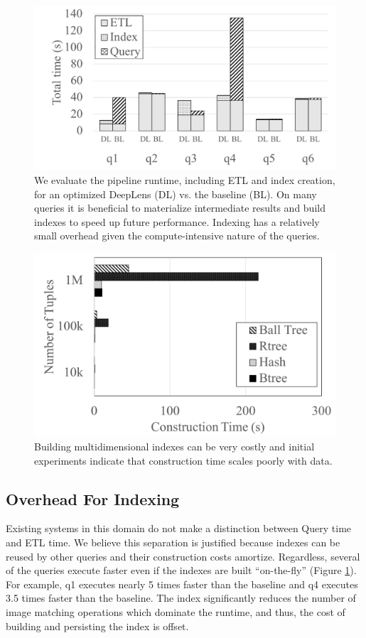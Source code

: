 \begin{figure}[t]
\centering
 \includegraphics[width=\columnwidth]{figures/indexing_ab.png}
 \caption{We evaluate the pipeline runtime, including ETL and index creation, for an optimized \textsf{DeepLens} (DL) vs. the baseline (BL). On many queries it is beneficial to materialize intermediate results and build indexes to speed up future performance. Indexing has a relatively small overhead given the compute-intensive nature of the queries.  \label{index} }
\end{figure}

\begin{figure}[t]
\centering
 \includegraphics[width=0.8\columnwidth]{figures/indexing.png}
 \caption{Building multidimensional indexes can be very costly and initial experiments indicate that construction time scales poorly with data. \label{indexbuild} }
\end{figure}

\subsection{Overhead For Indexing}
Existing systems in this domain do not make a distinction between Query time and ETL time.
We believe this separation is justified because indexes can be reused by other queries and their construction costs amortize.
Regardless, several of the queries execute faster even if the indexes are built ``on-the-fly'' (Figure \ref{index}).
For example, q1 executes nearly 5 times faster than the baseline and q4 executes 3.5 times faster than the baseline.
The index significantly reduces the number of image matching operations which dominate the runtime, and thus, the cost of building and persisting the index is offset.

